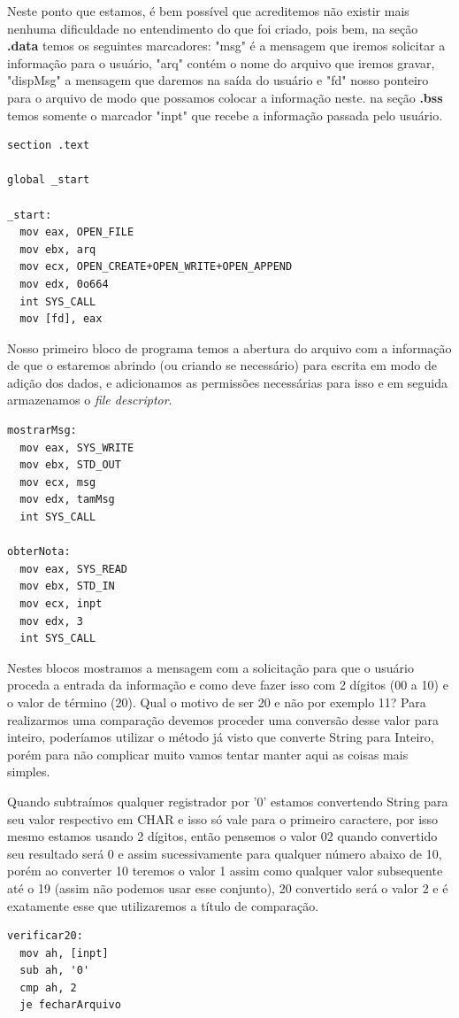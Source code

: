 Neste ponto que estamos, é bem possível que acreditemos não existir mais nenhuma dificuldade no entendimento do que foi criado, pois bem, na seção \textbf{.data} temos os seguintes marcadores: "msg" é a mensagem que iremos solicitar a informação para o usuário, "arq" contém o nome do arquivo que iremos gravar, "dispMsg" a mensagem que daremos na saída do usuário e "fd" nosso ponteiro para o arquivo de modo que possamos colocar a informação neste. na seção \textbf{.bss} temos somente o marcador "inpt" que recebe a informação passada pelo usuário.
\begin{lstlisting}[]
section .text

global _start
	
_start:
  mov eax, OPEN_FILE
  mov ebx, arq
  mov ecx, OPEN_CREATE+OPEN_WRITE+OPEN_APPEND
  mov edx, 0o664
  int SYS_CALL
  mov [fd], eax	
\end{lstlisting}

Nosso primeiro bloco de programa temos a abertura do arquivo com a informação de que o estaremos abrindo (ou criando se necessário) para escrita em modo de adição dos dados, e adicionamos as permissões necessárias para isso e em seguida armazenamos o \textit{file descriptor}.
\begin{lstlisting}[]
mostrarMsg:
  mov eax, SYS_WRITE
  mov ebx, STD_OUT
  mov ecx, msg
  mov edx, tamMsg
  int SYS_CALL
  
obterNota:
  mov eax, SYS_READ
  mov ebx, STD_IN
  mov ecx, inpt
  mov edx, 3
  int SYS_CALL  
\end{lstlisting}

Nestes blocos mostramos a mensagem com a solicitação para que o usuário proceda a entrada da informação e como deve fazer isso com 2 dígitos (00 a 10) e o valor de término (20). Qual o motivo de ser 20 e não por exemplo 11? Para realizarmos uma comparação devemos proceder uma conversão desse valor para inteiro, poderíamos utilizar o método já visto que converte String para Inteiro, porém para não complicar muito vamos tentar manter aqui as coisas mais simples.

Quando subtraímos qualquer registrador por '0' estamos convertendo String para seu valor respectivo em CHAR e isso só vale para o primeiro caractere, por isso mesmo estamos usando 2 dígitos, então pensemos o valor 02 quando convertido seu resultado será 0 e assim sucessivamente para qualquer número abaixo de 10, porém ao converter 10 teremos o valor 1 assim como qualquer valor subsequente até o 19 (assim não podemos usar esse conjunto), 20 convertido será o valor 2 e é exatamente esse que utilizaremos a título de comparação.
\begin{lstlisting}[]
verificar20:
  mov ah, [inpt]
  sub ah, '0'
  cmp ah, 2
  je fecharArquivo	
\end{lstlisting}

